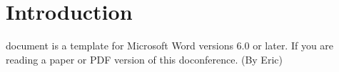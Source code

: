\documentclass[journal]{IEEEtran}
\begin{document}

%















%
\IEEEpeerreviewmaketitle{}
\section{Introduction}
 document is a template for Microsoft Word versions 6.0 or later. If you are reading a paper or PDF version of this doconference. (By Eric)
\end{document}
